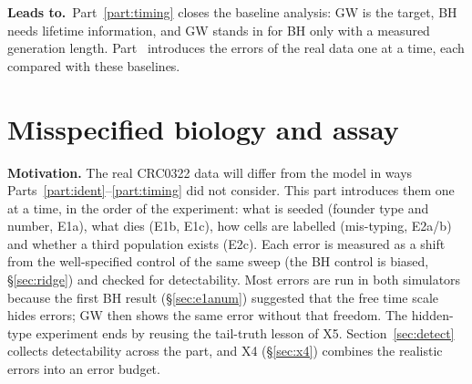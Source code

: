 \documentclass[10pt,a4paper]{article}
\newcommand{\Leads}[1]{\begin{leadbox}{\sffamily\bfseries\color{caqua!70!black}Leads to.}\ #1\end{leadbox}}
\newcommand{\partintro}[1]{\begin{keybox}#1\end{keybox}}
\newcommand{\sref}[1]{\S\ref{#1}}
\begin{document}
\Leads{Part~\ref{part:timing} closes the baseline analysis: GW is the target, BH needs lifetime information, and GW stands in for BH only with a measured generation length. Part~\ref{part:errors} introduces the errors of the real data one at a time, each compared with these baselines.}

\clearpage
\part{Misspecified biology and assay}\label{part:errors}
\partintro{\textbf{Motivation.} The real CRC0322 data will differ from the model in ways Parts~\ref{part:ident}--\ref{part:timing} did not consider. This part introduces them one at a time, in the order of the experiment: what is seeded (founder type and number, E1a), what dies (E1b, E1c), how cells are labelled (mis-typing, E2a/b) and whether a third population exists (E2c). Each error is measured as a shift from the well-specified control of the same sweep (the BH control is biased, \sref{sec:ridge}) and checked for detectability. Most errors are run in both simulators because the first BH result (\sref{sec:e1anum}) suggested that the free time scale hides errors; GW then shows the same error without that freedom. The hidden-type experiment ends by reusing the tail-truth lesson of X5. Section~\ref{sec:detect} collects detectability across the part, and X4 (\sref{sec:x4}) combines the realistic errors into an error budget.}
\end{document}
